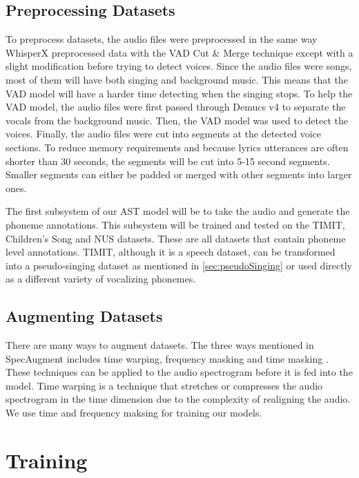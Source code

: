 \documentclass[letterpaper, 12pt]{article}
\begin{document}
\begin{multicols*}{2}
\subsection{Preprocessing Datasets}
To preprocess datasets, the audio files were preprocessed in the same way WhisperX preprocessed
data with the VAD Cut \& Merge technique \citep{whisperX} except with a slight modification before
trying to detect voices. Since the audio files were songs, most of them will have both singing and
background music. This means that the VAD model will have a harder time detecting when the singing
stops. To help the VAD model, the audio files were first passed through Demucs v4 \citep{Demucs}
to separate the vocals from the background music. Then, the VAD model was used to detect the
voices. Finally, the audio files were cut into segments at the detected voice sections. To reduce
memory requirements and because lyrics utterances are often shorter than 30 seconds, the segments
will be cut into 5-15 second segments. Smaller segments can either be padded
or merged with other segments into larger ones.

The first subsystem of our AST model will be to take the audio and generate the phoneme annotations.
This subsystem will be trained and tested on the TIMIT, Children's Song and NUS datasets. These are
all datasets that contain phoneme level annotations. TIMIT, although it is a speech dataset, can be
transformed into a pseudo-singing dataset as mentioned in \ref{sec:pseudoSinging} or used directly
as a different variety of vocalizing phonemes.

\subsection{Augmenting Datasets}
There are many ways to augment datasets. The three ways mentioned in SpecAugment includes
time warping, frequency masking and time masking \citep{SpecAugment}. These techniques can be
applied to the audio spectrogram before it is fed into the model. Time warping is a technique that
stretches or compresses the audio spectrogram in the time dimension due to the complexity of
realigning the audio. We use time and frequency maksing for training our models.


\section{Training}



\end{multicols*}
\end{document}
